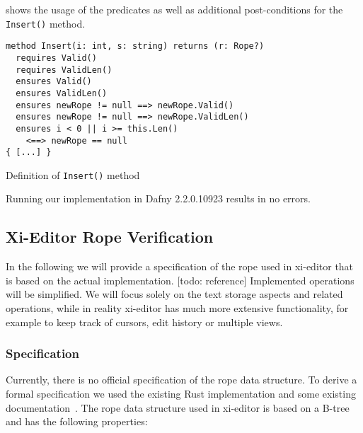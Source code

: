  shows the usage of the predicates as well as additional post-conditions for the \texttt{Insert()} method.

\begin{listing}[h!]
\begin{verbatim}
method Insert(i: int, s: string) returns (r: Rope?)
  requires Valid()
  requires ValidLen()
  ensures Valid()
  ensures ValidLen()
  ensures newRope != null ==> newRope.Valid()
  ensures newRope != null ==> newRope.ValidLen()
  ensures i < 0 || i >= this.Len() 
    <==> newRope == null
{ [...] }
\end{verbatim}
    \caption{Definition of \texttt{Insert()} method}
    \label{lst:insert}
\end{listing}

Running our implementation in Dafny 2.2.0.10923 results in no errors.


\subsection{Xi-Editor Rope Verification}

In the following we will provide a specification of the rope used in xi-editor that is based on the actual implementation. [todo: reference]
Implemented operations will be simplified.
We will focus solely on the text storage aspects and related operations, while in reality xi-editor has much more extensive functionality, for example to keep track of cursors, edit history or multiple views.

\subsubsection{Specification}

Currently, there is no official specification of the rope data structure. 
To derive a formal specification we used the existing Rust implementation and some existing documentation~\cite{xi-rope}.
The rope data structure used in xi-editor is based on a B-tree and has the following properties:
  
